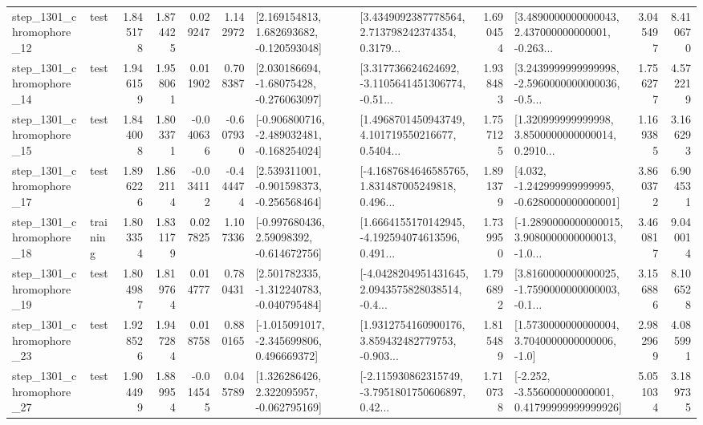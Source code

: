 \begin{tabular}{llrrrrllrlrr}
 step\_1301\_chromophore\_12 &      test &      1.845178 &    1.874425 &      0.029247 &  1.142972 &    [2.169154813, 1.682693682, -0.120593048] &  [3.4349092387778564, 2.713798242374354, 0.3179... &       1.690454 &  [3.4890000000000043, 2.437000000000001, -0.263... &            3.045497 &          8.410670 \\
 step\_1301\_chromophore\_14 &      test &      1.946159 &    1.958061 &      0.011902 &  0.708387 &    [2.030186694, -1.68075428, -0.276063097] &  [3.317736624624692, -3.1105641451306774, -0.51... &       1.938483 &  [3.2439999999999998, -2.5960000000000036, -0.5... &            1.756277 &          4.572219 \\
 step\_1301\_chromophore\_15 &      test &      1.844008 &    1.803371 &     -0.040636 & -0.607930 &  [-0.906800716, -2.489032481, -0.168254024] &  [1.4968701450943749, 4.101719550216677, 0.5404... &       1.757125 &  [1.320999999999998, 3.8500000000000014, 0.2910... &            1.169385 &          3.166293 \\
 step\_1301\_chromophore\_17 &      test &      1.896226 &    1.862114 &     -0.034112 & -0.444474 &   [2.539311001, -0.901598373, -0.256568464] &  [-4.1687684646585765, 1.831487005249818, 0.496... &       1.891379 &   [4.032, -1.242999999999995, -0.6280000000000001] &            3.860372 &          6.904531 \\
 step\_1301\_chromophore\_18 &  training &      1.803354 &    1.831179 &      0.027825 &  1.107336 &    [-0.997680436, 2.59098392, -0.614672756] &  [1.6664155170142945, -4.192594074613596, 0.491... &       1.739950 &  [-1.2890000000000015, 3.9080000000000013, -1.0... &            3.460817 &          9.040014 \\
 step\_1301\_chromophore\_19 &      test &      1.804987 &    1.819764 &      0.014777 &  0.780431 &   [2.501782335, -1.312240783, -0.040795484] &  [-4.0428204951431645, 2.0943575828038514, -0.4... &       1.796892 &  [3.8160000000000025, -1.7590000000000003, -0.1... &            3.156886 &          8.106528 \\
 step\_1301\_chromophore\_23 &      test &      1.928526 &    1.947284 &      0.018758 &  0.880165 &   [-1.015091017, -2.345699806, 0.496669372] &  [1.9312754160900176, 3.859432482779753, -0.903... &       1.815489 &     [1.5730000000000004, 3.7040000000000006, -1.0] &            2.982969 &          4.085991 \\
 step\_1301\_chromophore\_27 &      test &      1.904499 &    1.889954 &     -0.014545 &  0.045789 &    [1.326286426, 2.322095957, -0.062795169] &  [-2.115930862315749, -3.7951801750606897, 0.42... &       1.710738 &  [-2.252, -3.556000000000001, 0.41799999999999926] &            5.051034 &          3.189735 \\

\end{tabular}
